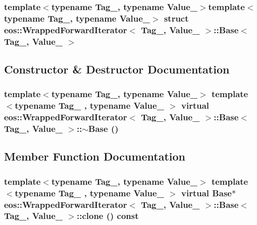 \subsubsection*{template$<$typename Tag\_\-, typename Value\_\-$>$template$<$typename Tag\_\-, typename Value\_\-$>$ struct eos::WrappedForwardIterator$<$ Tag\_\-, Value\_\- $>$::Base$<$ Tag\_\-, Value\_\- $>$}



\subsection{Constructor \& Destructor Documentation}
\hypertarget{structeos_1_1WrappedForwardIterator_1_1Base_a4d6dc901016516de2f269abb38446c22}{
\subsubsection[{$\sim$Base}]{\setlength{\rightskip}{0pt plus 5cm}template$<$typename Tag\_\-, typename Value\_\-$>$ template$<$typename Tag\_\- , typename Value\_\- $>$ virtual {\bf eos::WrappedForwardIterator}$<$ Tag\_\-, Value\_\- $>$::{\bf Base}$<$ Tag\_\-, Value\_\- $>$::$\sim${\bf Base} ()}}
\label{structeos_1_1WrappedForwardIterator_1_1Base_a4d6dc901016516de2f269abb38446c22}


\subsection{Member Function Documentation}
\hypertarget{structeos_1_1WrappedForwardIterator_1_1Base_a146a4e18680684f22bb7ca73f662718d}{
\subsubsection[{clone}]{\setlength{\rightskip}{0pt plus 5cm}template$<$typename Tag\_\-, typename Value\_\-$>$ template$<$typename Tag\_\- , typename Value\_\- $>$ virtual {\bf Base}$\ast$ {\bf eos::WrappedForwardIterator}$<$ Tag\_\-, Value\_\- $>$::{\bf Base}$<$ Tag\_\-, Value\_\- $>$::clone () const}}
\label{structeos_1_1WrappedForwardIterator_1_1Base_a146a4e18680684f22bb7ca73f662718d}


